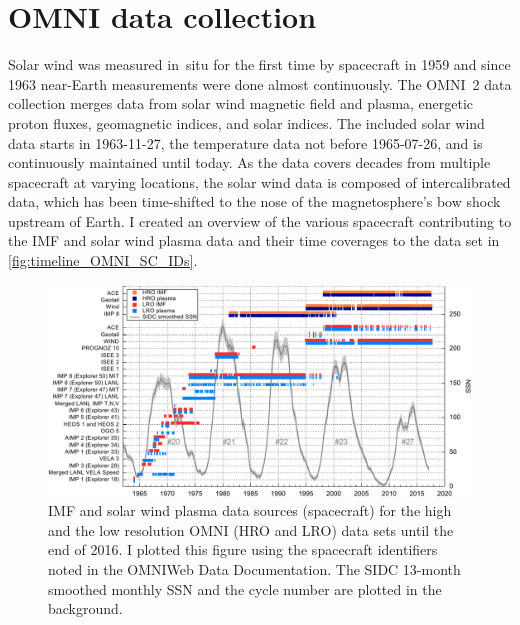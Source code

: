 \section{OMNI data collection}
\label{sec:omni_data_collection}
Solar wind was measured in~situ for the first time by spacecraft in 1959 and since 1963 near-Earth measurements were done almost continuously. The OMNI~2 data collection \citep{King2005} merges data from solar wind magnetic field and plasma, energetic proton fluxes, geomagnetic indices, and solar indices. The included solar wind data starts in \mbox{1963-11-27}, the temperature data not before \mbox{1965-07-26}, and is continuously maintained until today. As the data covers decades from multiple spacecraft at varying locations, the solar wind data is composed of intercalibrated data, which has been time-shifted to the nose of the magnetosphere's bow shock upstream of Earth. I created an overview of the various spacecraft contributing to the IMF and solar wind plasma data and their time coverages to the data set in \autoref{fig:timeline_OMNI_SC_IDs}.
\begin{figure}[htb]
	\centering
	\includegraphics[width=\textwidth]{figures_of_mine/gnuplots/timeline_OMNI_SC_IDs.pdf}
	\caption[]
	{IMF and solar wind plasma data sources (spacecraft) for the high and the low resolution OMNI (HRO and LRO) data sets until the end of 2016. I plotted this figure using the spacecraft identifiers noted in the OMNIWeb Data Documentation\protect\footnotemark. The SIDC 13-month smoothed monthly SSN and the cycle number are plotted in the background.}
	\label{fig:timeline_OMNI_SC_IDs}
\end{figure}

